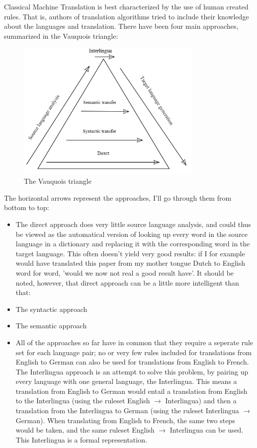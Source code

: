 \documentclass[12pt]{article}
\begin{document}
Classical Machine Translation is best characterized by the use of human created rules. That is, authors of translation algorithms tried to include their knowledge about the languages and translation. There have been four main approaches, summarized in the Vauquois triangle: \\

\begin{figure}[htb]
\centering
\includegraphics[width=0.8\textwidth]{vauquois.png}
\caption{The Vauquois triangle}
\label{fig:vauquois}
\end{figure}

The horizontal arrows represent the approaches, I'll go through them from bottom to top:

\begin{itemize}
\item The direct approach does very little source language analysis, and could thus be viewed as the automatical version of looking up every word in the source language in a dictionary and replacing it with the corresponding word in the target language. This often doesn't yield very good results: if I for example would have translated this paper from my mother tongue Dutch to English word for word, 'would we now not real a good result have'. It should be noted, however, that direct approach can be a little more intelligent than that: %
\item The syntactic approach
\item The semantic approach
\item All of the approaches so far have in common that they require a seperate rule set for each language pair; no or very few rules included for translations from English to German can also be used for translations from English to French. The Interlingua approach is an attempt to solve this problem, by pairing up every language with one general language, the Interlingua. This means a translation from English to German would entail a translation from English to the Interlingua (using the ruleset English $\rightarrow$ Interlingua) and then a translation from the Interlingua to German (using the ruleset Interlingua $\rightarrow$ German). When translating from English to French, the same two steps would be taken, and the same ruleset English $\rightarrow$ Interlingua can be used. This Interlingua is a formal representation.
\end{itemize}
\end{document}
